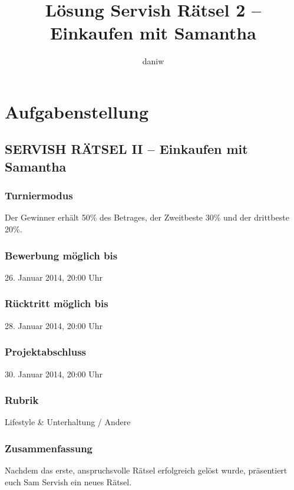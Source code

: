 \documentclass[a4paper, 10pt, fleqn]{article}
\title{Lösung Servish Rätsel 2 -- Einkaufen mit Samantha}
\author{daniw}
\begin{document}
\maketitle
\newpage
\tableofcontents
\newpage

\section{Aufgabenstellung}

\subsection*{SERVISH RÄTSEL II -- Einkaufen mit Samantha}

\subsubsection*{Turniermodus}
Der Gewinner erhält 50\% des Betrages, der Zweitbeste 30\% und der drittbeste 20\%. 

\subsubsection*{Bewerbung möglich bis}
26. Januar 2014, 
20:00 Uhr 

\subsubsection*{Rücktritt möglich bis}
28. Januar 2014, 
20:00 Uhr 

\subsubsection*{Projektabschluss}
30. Januar 2014, 
20:00 Uhr 

\subsubsection*{Rubrik}
Lifestyle \& Unterhaltung / Andere

\subsubsection*{Zusammenfassung}
Nachdem das erste, anspruchsvolle Rätsel erfolgreich gelöst wurde, präsentiert 
euch Sam Servish ein neues Rätsel. 
\end{document}
